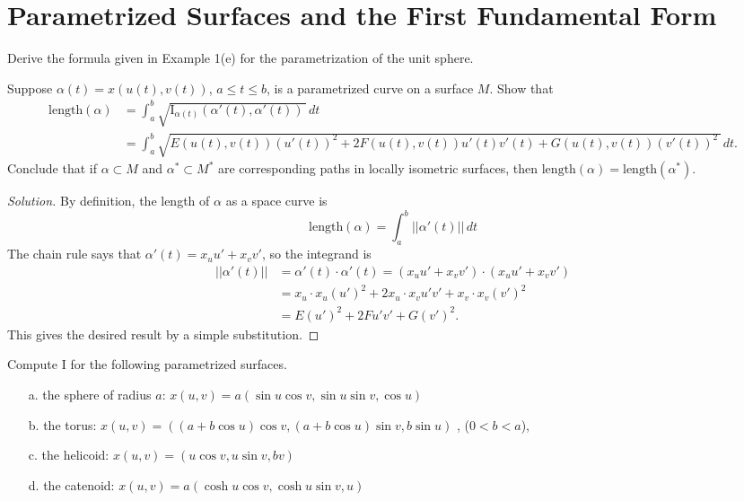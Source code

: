 \documentclass[Shifrin_Solutions_Spring_2015]{subfiles}
\begin{document}
\section{Parametrized Surfaces and the First Fundamental Form}

\begin{exercise}
Derive the formula given in Example 1(e) for the parametrization of the unit sphere.
\end{exercise}




\begin{exercise}
Suppose $\alpha(t) = x(u(t), v(t) )$, $a \leq t \leq b$, is a parametrized curve on a surface $M$. Show that
\[
\begin{split}
\mathrm{length}(\alpha) & = \int_a^b \sqrt{ \mathrm{I}_{\alpha(t)} ( \alpha'(t), \alpha'(t) ) \, } \, dt \\
	& = \int_a^b \sqrt{ E(u(t), v(t)) (u'(t))^2 + 2 F(u(t),v(t)) u'(t) v'(t) + G(u(t),v(t)) (v'(t))^2 \,   } \, dt .
\end{split}
\]
Conclude that if $\alpha \subset M$ and $\alpha^* \subset M^*$ are corresponding paths in locally isometric surfaces, then $\mathrm{length}(\alpha) = \mathrm{length}(\alpha^*)$.
\end{exercise}

\begin{proof}[Solution] By definition, the length of $\alpha$ as a space curve is
\[
\mathrm{length}(\alpha) = \int_a^b ||\alpha'(t) || \, dt
\]
The chain rule says that $\alpha'(t) = x_u u' + x_v v'$, so the integrand is
\[
\begin{split}
||\alpha'(t) || & = \alpha'(t) \cdot \alpha'(t) = \left(x_u u' + x_v v'\right)\cdot \left(x_u u' + x_v v'\right)\\
	& = x_u\cdot x_u (u')^2 + 2 x_u\cdot x_v u' v' + x_v\cdot x_v (v')^2 \\
	& = E (u')^2 + 2F u'v' + G(v')^2.
\end{split}
\]
This gives the desired result by a simple substitution.
\end{proof}

\begin{exercise}
Compute $\mathrm{I}$ for the following parametrized surfaces.
\begin{itemize}
\item[a.] the sphere of radius $a$: $x(u,v) = a ( \sin u \cos v, \sin u \sin v, \cos u )$
\item[b.] the torus: $x(u,v) = ( (a+b\cos u) \cos v , (a + b \cos u) \sin v , b \sin u )$ , ($0<b < a$),
\item[c.] the helicoid: $x(u,v) = (u \cos v , u \sin v, bv )$
\item[d.] the catenoid: $ x(u,v) = a (\cosh u \cos v , \cosh u \sin v, u)$
\end{itemize}
\end{exercise}
\end{document}
